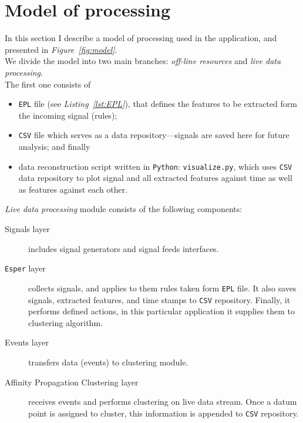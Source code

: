 \documentclass[11pt, letterpaper]{article}            %
\begin{document}
\section{Model of processing}
In this section I describe a model of processing used in the application, and presented in \textit{Figure~\ref{fig:model}}.\\

We divide the model into two main branches: \emph{off-line resources} and \emph{live data processing}.\\
The first one consists of
\begin{itemize}
\item \texttt{EPL} file (see \textit{Listing~\ref{lst:EPL}}), that defines the features to be extracted form the incoming signal (rules);
\item \texttt{CSV} file which serves as a data repository---signals are saved here for future analysis; and finally
\item data reconstruction script written in \texttt{Python}: \texttt{visualize.py}, which uses \texttt{CSV} data repository to plot signal and all extracted features against time as well as features against each other.
\end{itemize}
\emph{Live data processing} module consists of the following components:
\begin{description}
    \item[Signals layer] includes signal generators and signal feeds interfaces.
    \item[\texttt{Esper} layer] collects signals, and applies to them rules taken form \texttt{EPL} file. It also saves signals, extracted features, and time stamps to \texttt{CSV} repository. Finally, it performs defined actions, in this particular application it supplies them to clustering algorithm.
    \item[Events layer] transfers data (events) to clustering module.
    \item[Affinity Propagation Clustering layer] receives events and performs clustering on live data stream. Once a datum point is assigned to cluster, this information is appended to \texttt{CSV} repository.
\end{description}
\end{document}
